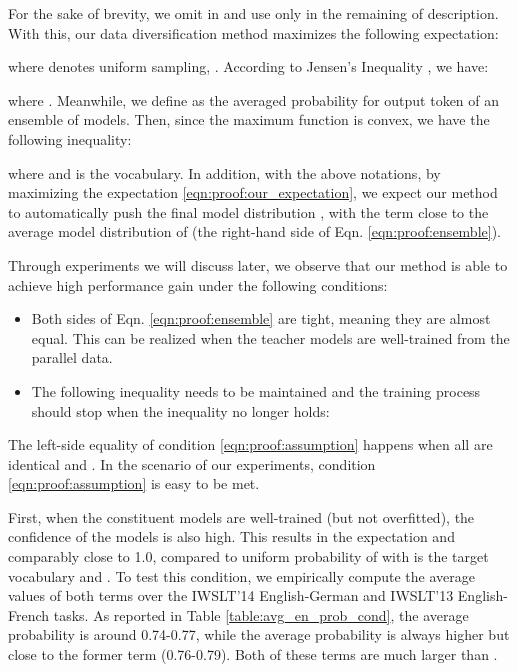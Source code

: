 \documentclass{article}
\begin{document}
For the sake of brevity, we omit  in  and use only  in the remaining of description. With this, our data diversification method maximizes the following expectation:


where  denotes uniform sampling, . According to Jensen's Inequality \citep{jensen1906fonctions}, we have:

where . Meanwhile, we define  as the averaged probability for output token  of an ensemble of models. Then, since the maximum function is convex, we have the following inequality:

where  and  is the vocabulary. In addition, with the above notations, by maximizing the expectation \ref{eqn:proof:our_expectation}, we expect our method to automatically push the final model distribution , with the term  close to the average model distribution of  (the right-hand side of Eqn. \ref{eqn:proof:ensemble}). 

Through experiments we will discuss later, we observe that our method is able to achieve high performance gain under the following conditions:
\begin{itemize}
    \item Both sides of Eqn. \ref{eqn:proof:ensemble} are tight, meaning they are almost equal. This can be realized when the teacher models are well-trained from the parallel data.
    \item The following inequality needs to be maintained and the training process should stop when the inequality no longer holds:
\end{itemize}

The left-side equality of condition \ref{eqn:proof:assumption} happens when all  are identical  and .
In the scenario of our experiments, condition \ref{eqn:proof:assumption} is easy to be met. 

First, when the constituent models  are well-trained (but not overfitted), the confidence of the models is also high. This results in the expectation  and  comparably close to 1.0, compared to uniform probability of  with  is the target vocabulary and . To test this condition, we empirically compute the average values of both terms over the IWSLT'14 English-German and IWSLT'13 English-French tasks. As reported in Table \ref{table:avg_en_prob_cond}, the average probability  is around 0.74-0.77, while the average probability  is always higher but close to the former term (0.76-0.79). Both of these terms are much larger than . 
\end{document}
